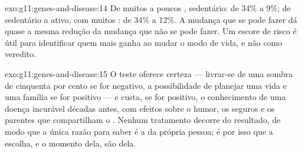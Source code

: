 \begin{solution}{exo:g11:genes-and-disease:14}
De muitos a poucos , sedentário: de 34\% a 9\%; de sedentário a
ativo, com muitos : de 34\% a 12\%. A mudança que se pode fazer
dá quase a mesma redução da mudança que não se pode fazer. Um escore de
risco é útil para identificar quem mais ganha ao mudar o modo de vida,
e não como veredito.
\end{solution}

\begin{solution}{exo:g11:genes-and-disease:15}
O teste oferece certeza --- livrar-se de uma sombra de cinquenta por
cento se for negativo, a possibilidade de planejar uma vida e uma
família se for positivo --- e custa, se for positivo, o conhecimento de
uma doença incurável décadas antes, com efeitos sobre o humor, os
seguros e os parentes que compartilham o . Nenhum tratamento
decorre do resultado, de modo que a única razão para saber é a da
própria pessoa; é por isso que a escolha, e o momento dela, são dela.
\end{solution}


